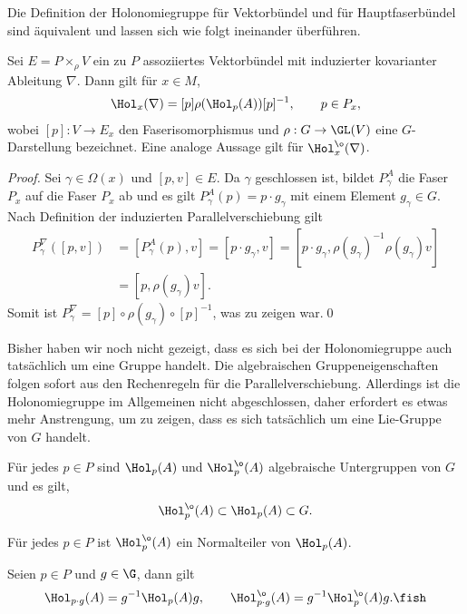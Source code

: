 \documentclass[%
	paper=a5,%
	fleqn,%
	DIV=18,%
	BCOR=0mm,
	fontsize=11pt,
	titlepage=false,%
	bibliography=totoc,
	DIV=18,%
	twoside=true,
	pdftitle=Riemannsche Geometrie,
	pdfauthor=Uwe Semmelmann,
	numbers=noendperiod]%
	{scrbook}
\begin{document}
Die Definition der Holonomiegruppe für Vektorbündel und für Hauptfaserbündel sind äquivalent und lassen sich wie folgt ineinander überführen.

\begin{prop}
Sei $E= P\times_\rho V$ ein zu $P$ assoziiertes Vektorbündel mit induzierter kovarianter Ableitung $\nabla$. Dann gilt für $x\in M$,
\begin{align*}
\Hol_x(\nabla) = [p] \rho(\Hol_p(A))[p]^{-1},\qquad p\in P_x,
\end{align*}
wobei $[p]: V\to E_x$ den Faserisomorphismus und $\rho: G\to \GL(V)$ eine
$G$-Darstellung bezeichnet. Eine analoge Aussage gilt f\"ur $\Hol_{x}^{\o}(\nabla)$.\fish
\end{prop}
\begin{proof}
Sei $\gamma\in \Omega(x)$ und $[p,v]\in E$. Da $\gamma$ geschlossen ist, bildet
$P_\gamma^A$ die Faser $P_x$ auf die Faser $P_x$ ab und es gilt $P_\gamma^A(p)
= p\cdot g_\gamma$ mit einem Element $g_\gamma\in G$. Nach Definition der
induzierten Parallelverschiebung gilt
\begin{align*}
P_\gamma^\nabla([p,v]) &= [P_\gamma^A(p),v]
= [p\cdot g_\gamma, v]
= [p\cdot g_\gamma, \rho(g_\gamma)^{-1} \rho(g_\gamma)v]\\
&= [p, \rho(g_\gamma)v].
\end{align*}
Somit ist $P_{\gamma}^{\nabla}  = [p] \circ \rho(g_{\gamma}) \circ [p]^{-1}$, was zu zeigen war.\qed
\end{proof}

Bisher haben wir noch nicht gezeigt, dass es sich bei der Holonomiegruppe auch tats\"achlich um eine Gruppe handelt. Die algebraischen Gruppeneigenschaften folgen sofort aus den Rechenregeln f\"ur die Parallelverschiebung. Allerdings ist die Holonomiegruppe im Allgemeinen nicht abgeschlossen, daher erfordert es etwas mehr Anstrengung, um zu zeigen, dass es sich tats\"achlich um eine Lie-Gruppe von $G$ handelt.

\begin{lem}
\begin{propenum}
\item F\"ur jedes $p\in P$ sind $\Hol_{p}(A)$ und $\Hol_{p}^{\o}(A)$ algebraische Untergruppen von $G$ und es gilt,
\begin{align*}
\Hol_{p}^{\o}(A)\subset \Hol_{p}(A) \subset G.
\end{align*}
\item Für jedes $p\in P$ ist $\Hol_{p}^\o(A)$ ein Normalteiler von $\Hol_{p}(A)$.
\item Seien $p\in P$ und $g\in \G$, dann gilt
\begin{align*}
\Hol_{p\cdot g}(A) = g^{-1}\Hol_{p}(A)g,\qquad
\Hol_{p\cdot g}^\o(A) = g^{-1}\Hol_{p}^\o(A)g.\fish
\end{align*}
\end{propenum}
\end{lem}
\end{document}
